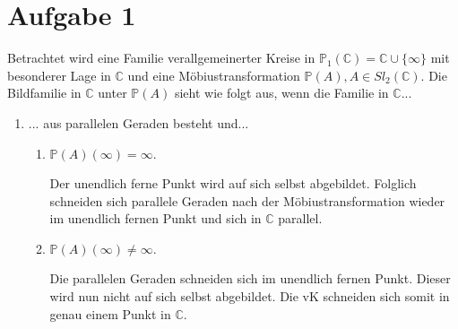 \documentclass[11pt]{article}
\begin{document}
	
	\section*{Aufgabe 1}
	Betrachtet wird eine Familie verallgemeinerter Kreise in $ \mathbb{P}_1(\mathbb{C}) = \mathbb{C} \cup \lbrace \infty \rbrace $ mit besonderer Lage in $ \mathbb{C} $ und eine Möbiustransformation $ \mathbb{P}(A), A \in Sl_2(\mathbb{C}) $. Die Bildfamilie in $ \mathbb{C} $ unter $ \mathbb{P}(A) $ sieht wie folgt aus, wenn die Familie in $ \mathbb{C} $...
	\begin{enumerate}
		\item ... aus parallelen Geraden besteht und...
		\begin{enumerate}
			\item $ \mathbb{P}(A)(\infty) = \infty $.
			\begin{center}
			\end{center}
			Der unendlich ferne Punkt wird auf sich selbst abgebildet. Folglich schneiden sich parallele Geraden nach der Möbiustransformation wieder im unendlich fernen Punkt und sich in $ \mathbb{C} $ parallel.
			\item $ \mathbb{P}(A)(\infty) \neq \infty $.
			\begin{center}
			\end{center}
			Die parallelen Geraden schneiden sich im unendlich fernen Punkt. Dieser wird nun nicht auf sich selbst abgebildet. Die vK schneiden sich somit in genau einem Punkt in $ \mathbb{C} $.

\end{enumerate}
\end{enumerate}
\end{document}
